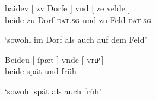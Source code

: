 \begin{exe}
\ex \label{ex:beidquantsyncont}
	\begin{xlist}
	\ex \label{ex:caokoordsyn_3_2}
		\gll baidev \textup{[} zv Dorfe \textup{]} vnd
				\textup{[} ze velde \textup{]} \\
			beide {} zu Dorf-\textsc{dat.sg} {} und {} zu Feld-\textsc{dat.sg} {} \\
		\begin{taggedline}{\parencites(Michelstetten, Bz.~Mistelbach, 1299)[\pno~3319, 461.28]{cao4}}
		\trans `sowohl im Dorf als auch auf dem Feld'
		\end{taggedline}

		\medskip

	\ex \label{ex:syntintvar1_2}
		\gll Beideu \textup{[} ſpæt \textup{]} vnde
			\textup{[} vruͦ \textup{]} \\ beide {} spät {} und {}
			früh {} \\
		\begin{taggedline}{\parencites[\pno~19\va, 15]{kc:B1}[vgl.][\pno~33\ra, 36]{kc:VB}}
		\trans `sowohl spät als auch früh'
		\end{taggedline}

	\end{xlist}
\end{exe}

